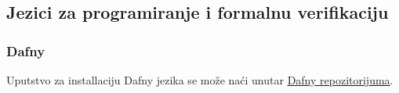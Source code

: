 \subsection{Jezici za programiranje i formalnu verifikaciju}\label{jezici-za-programiranje-i-formalnu-verifikaciju}

\subsubsection{Dafny}\label{dafny}

Uputstvo za installaciju Dafny jezika se može naći unutar \href{https://github.com/dafny-lang/dafny/wiki/INSTALL}{Dafny repozitorijuma}.

